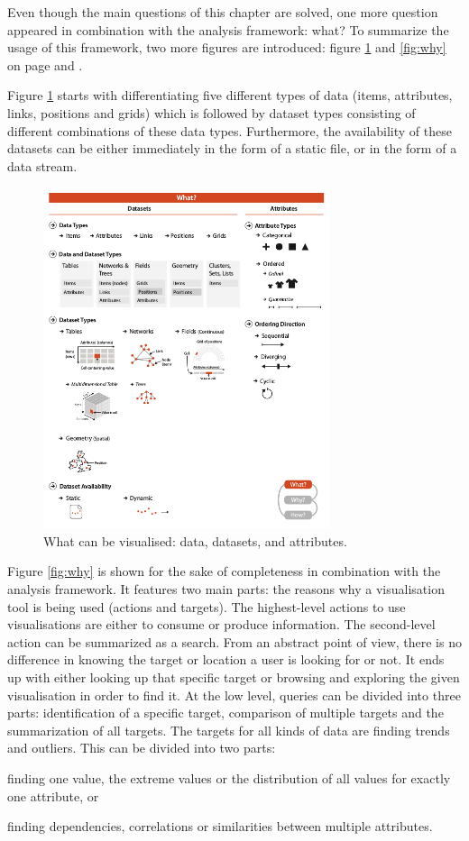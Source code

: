 Even though the main questions of this chapter are solved, one more question appeared in combination with the analysis framework: what? To summarize the usage of this framework, two more figures are introduced: figure \ref{fig:what} and \ref{fig:why} on page \pageref{fig:what} and \pageref{fig:why}.

Figure \ref{fig:what} starts with differentiating five different types of data (items, attributes, links, positions and grids) which is followed by dataset types consisting of different combinations of these data types. Furthermore, the availability of these datasets can be either immediately in the form of a static file, or in the form of a data stream.

\begin{figure}[!htb]
\centering
\includegraphics[height=10cm,keepaspectratio]{images/basics/what.png}
\caption[
    What can be visualised: data, datasets, and attributes .
]{What can be visualised: data, datasets, and attributes.}
\label{fig:what}
\end{figure}

Figure \ref{fig:why} is shown for the sake of completeness in combination with the analysis framework. It features two main parts: the reasons why a visualisation tool is being used (actions and targets). The highest-level actions to use visualisations are either to consume or produce information. The second-level action can be summarized as a search. From an abstract point of view, there is no difference in knowing the target or location a user is looking for or not. It ends up with either looking up that specific target or browsing and exploring the given visualisation in order to find it. At the low level, queries can be divided into three parts: identification of a specific target, comparison of multiple targets and the summarization of all targets.
The targets for all kinds of data are finding trends and outliers. This can be divided into two parts:
\begin{enumerate*}
\item finding one value, the extreme values or the distribution of all values for exactly one attribute, or
\item finding dependencies, correlations or similarities between multiple attributes.
\end{enumerate*}

